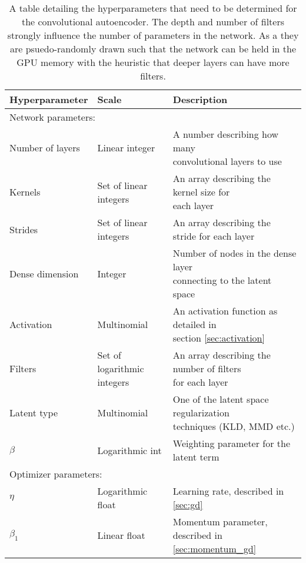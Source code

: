 \begin{table}
\centering
\setlength{\extrarowheight}{15pt}
\hspace*{-0.5in}
\begin{tabular}{|l|l|l|}
\hline
Hyperparameter & Scale & Description \\
\hline \hline
\multicolumn{3}{|l|}{Network parameters: } \\
\hline
Number of layers & Linear integer & \makecell[l]{A number describing how many \\ convolutional layers to use }\\
Kernels & Set of linear integers & \makecell[l]{An array describing the kernel size for \\ each layer} \\
Strides & Set of linear integers & An array describing the stride for each layer \\
Dense dimension & Integer & \makecell[l]{Number of nodes in the dense layer \\ connecting to the latent space} \\
Activation & Multinomial & \makecell[l]{An activation function as detailed in  \\ section \ref{sec:activation}} \\
Filters & Set of logarithmic integers & \makecell[l]{An array describing the number of filters \\ for each layer} \\ 
Latent type & Multinomial & \makecell[l]{One of the latent space regularization \\techniques (KLD, MMD etc.)} \\
$\beta$ & Logarithmic int & Weighting parameter for the latent term \\
\hline
\multicolumn{3}{|l|}{Optimizer parameters: } \\
\hline
$\eta$ & Logarithmic float & Learning rate, described in \ref{sec:gd} \\
$\beta_1$ & Linear float & Momentum parameter, described in \ref{sec:momentum_gd} \\
\hline
\end{tabular}
\caption{A table detailing the hyperparameters that need to be determined for the convolutional autoencoder. The depth and number of filters strongly influence the number of parameters in the network. As a they are psuedo-randomly drawn such that the network can be held in the GPU memory with the heuristic that deeper layers can have more filters.}\label{tab:convae_hyperparams}
\end{table}